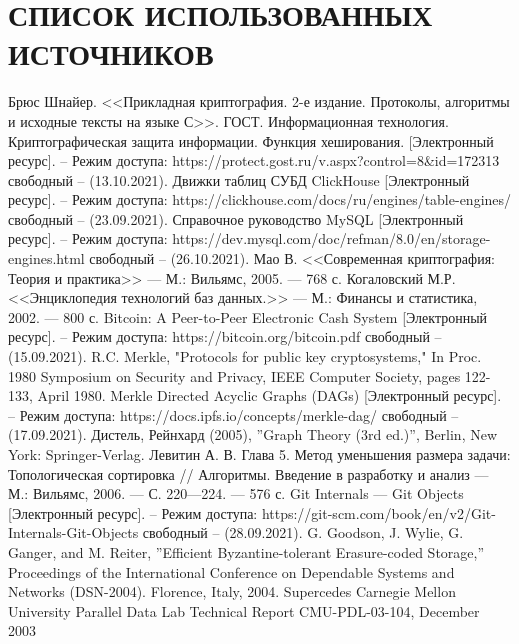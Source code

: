 \section*{СПИСОК ИСПОЛЬЗОВАННЫХ ИСТОЧНИКОВ}

\begingroup
\renewcommand{\section}[2]{}
\begin{thebibliography}{}
    Брюс Шнайер. <<Прикладная криптография. 2-е издание. Протоколы, алгоритмы и исходные тексты на языке С>>.
    ГОСТ. Информационная технология. Криптографическая защита информации. Функция хеширования. [Электронный ресурс]. – Режим доступа: https://protect.gost.ru/v.aspx?control=8&id=172313 свободный – (13.10.2021).
    Движки таблиц СУБД ClickHouse [Электронный ресурс]. – Режим доступа: https://clickhouse.com/docs/ru/engines/table-engines/ свободный – (23.09.2021).
    Справочное руководство MySQL [Электронный ресурс]. – Режим доступа: https://dev.mysql.com/doc/refman/8.0/en/storage-engines.html свободный – (26.10.2021).
    Мао В. <<Современная криптография: Теория и практика>> — М.: Вильямс, 2005. — 768 с.
    Когаловский М.Р. <<Энциклопедия технологий баз данных.>> — М.: Финансы и статистика, 2002. — 800 с.
    Bitcoin: A Peer-to-Peer Electronic Cash System [Электронный ресурс]. – Режим доступа: https://bitcoin.org/bitcoin.pdf свободный – (15.09.2021).
    R.C. Merkle, "Protocols for public key cryptosystems," In Proc. 1980 Symposium on Security and Privacy, IEEE Computer Society, pages 122-133, April 1980.
    Merkle Directed Acyclic Graphs (DAGs) [Электронный ресурс]. – Режим доступа: https://docs.ipfs.io/concepts/merkle-dag/ свободный – (17.09.2021).
    Дистель, Рейнхард (2005), ''Graph Theory (3rd ed.)'', Berlin, New York: Springer-Verlag.
    Левитин А. В. Глава 5. Метод уменьшения размера задачи: Топологическая сортировка // Алгоритмы. Введение в разработку и анализ — М.: Вильямс, 2006. — С. 220—224. — 576 с.
    Git Internals --- Git Objects [Электронный ресурс]. – Режим доступа: https://git-scm.com/book/en/v2/Git-Internals-Git-Objects свободный – (28.09.2021).
    G. Goodson, J. Wylie, G. Ganger, and M. Reiter, ''Efficient Byzantine-tolerant Erasure-coded Storage,'' Proceedings of the International Conference on Dependable Systems and Networks (DSN-2004). Florence, Italy, 2004. Supercedes Carnegie Mellon University Parallel Data Lab Technical Report CMU-PDL-03-104, December 2003

\end{thebibliography}
